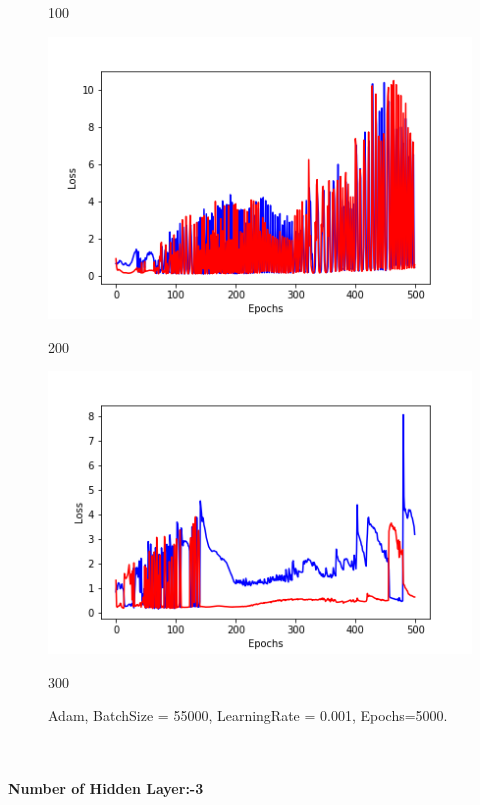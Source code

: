 \documentclass[20pt]{report}
\begin{document}
\begin{figure}[!htb]
	\caption{100}
\endminipage\hfill
{}
  \includegraphics[width=\linewidth]{2_200.png}
	\caption{200}
\endminipage\hfill
{}
  \includegraphics[width=\linewidth]{2_300.png}
	\caption{300}
\endminipage\hfill
\caption{Adam, BatchSize = 55000, LearningRate = 0.001, Epochs=5000.}
\end{figure}
\\\\
\textbf{Number of Hidden Layer:-3}\\
\end{document}

